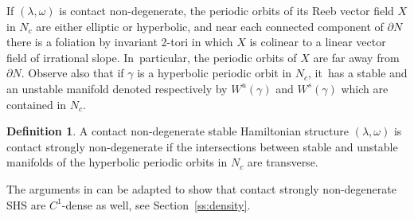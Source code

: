 \documentclass[JEP,XML,SOM,Unicode,NoEqCountersInSection,NoFloatCountersInSection,published]{cedram}
\theoremstyle{definition}
\newtheorem{defi}[theorem]{Definition}
\begin{document}
If $(\lambda,\omega)$ is contact non-degenerate, the periodic orbits of its Reeb vector field $X$ in $N_c$ are either elliptic or hyperbolic, and near each connected component of $\partial N$ there is a foliation by invariant 2-tori in which $X$ is colinear to a linear vector field of irrational slope. In~particular, the periodic orbits of $X$ are far away from $\partial N$. Observe also that if $\gamma$ is a hyperbolic periodic orbit in $N_c$, it~has a stable and an unstable manifold denoted respectively by $W^u(\gamma)$ and $W^s(\gamma)$ which are contained in $N_c$.

\begin{defi}
A contact non-degenerate stable Hamiltonian structure $(\lambda,\omega)$ is contact strongly non-degenerate if the intersections between stable and unstable manifolds of the hyperbolic periodic orbits in $N_c$ are transverse.
\end{defi}

The arguments in \cite{CV1} can be adapted to show that contact strongly non-degenerate SHS are $C^1$-dense as well, see Section~\ref{ss:density}.
\end{document}
